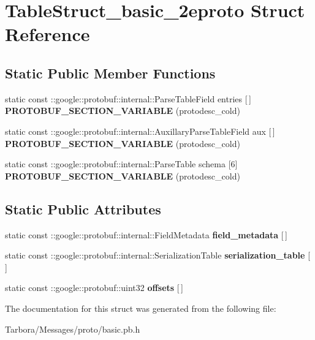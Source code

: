 \hypertarget{structTableStruct__basic__2eproto}{}\section{Table\+Struct\+\_\+basic\+\_\+2eproto Struct Reference}
\label{structTableStruct__basic__2eproto}
\subsection*{Static Public Member Functions}
\begin{DoxyCompactItemize}
\item 
\mbox{\label{structTableStruct__basic__2eproto_a8a69c04c9661099b357ee28210034697}} 
static const \+::google\+::protobuf\+::internal\+::\+Parse\+Table\+Field entries \mbox{[}$\,$\mbox{]} {\bfseries P\+R\+O\+T\+O\+B\+U\+F\+\_\+\+S\+E\+C\+T\+I\+O\+N\+\_\+\+V\+A\+R\+I\+A\+B\+LE} (protodesc\+\_\+cold)
\item 
\mbox{\label{structTableStruct__basic__2eproto_a9d8a7a61519b6bcc5986e17f76d36bc0}} 
static const \+::google\+::protobuf\+::internal\+::\+Auxillary\+Parse\+Table\+Field aux \mbox{[}$\,$\mbox{]} {\bfseries P\+R\+O\+T\+O\+B\+U\+F\+\_\+\+S\+E\+C\+T\+I\+O\+N\+\_\+\+V\+A\+R\+I\+A\+B\+LE} (protodesc\+\_\+cold)
\item 
\mbox{\label{structTableStruct__basic__2eproto_a3762301ae456ad171367920f63a40421}} 
static const \+::google\+::protobuf\+::internal\+::\+Parse\+Table schema \mbox{[}6\mbox{]} {\bfseries P\+R\+O\+T\+O\+B\+U\+F\+\_\+\+S\+E\+C\+T\+I\+O\+N\+\_\+\+V\+A\+R\+I\+A\+B\+LE} (protodesc\+\_\+cold)
\end{DoxyCompactItemize}
\subsection*{Static Public Attributes}
\begin{DoxyCompactItemize}
\item 
\mbox{\label{structTableStruct__basic__2eproto_a3692de445586bb9c6cc206c1d5d503f3}} 
static const \+::google\+::protobuf\+::internal\+::\+Field\+Metadata {\bfseries field\+\_\+metadata} \mbox{[}$\,$\mbox{]}
\item 
\mbox{\label{structTableStruct__basic__2eproto_af49ab19c14924b0b595ae6dbeba4be03}} 
static const \+::google\+::protobuf\+::internal\+::\+Serialization\+Table {\bfseries serialization\+\_\+table} \mbox{[}$\,$\mbox{]}
\item 
\mbox{\label{structTableStruct__basic__2eproto_a17b8ea13c4130d451e8f1ddb67e30b4f}} 
static const \+::google\+::protobuf\+::uint32 {\bfseries offsets} \mbox{[}$\,$\mbox{]}
\end{DoxyCompactItemize}


The documentation for this struct was generated from the following file\+:\begin{DoxyCompactItemize}
\item 
Tarbora/\+Messages/proto/basic.\+pb.\+h\end{DoxyCompactItemize}
